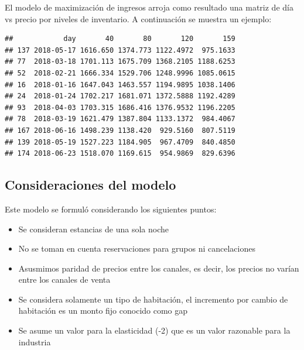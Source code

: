 El modelo de maximización de ingresos arroja como resultado una matriz de día vs precio por niveles de inventario. A continuación se muestra un ejemplo:

\begin{verbatim}
##            day       40       80       120       159
## 137 2018-05-17 1616.650 1374.773 1122.4972  975.1633
## 77  2018-03-18 1701.113 1675.709 1368.2105 1188.6253
## 52  2018-02-21 1666.334 1529.706 1248.9996 1085.0615
## 16  2018-01-16 1647.043 1463.557 1194.9895 1038.1406
## 24  2018-01-24 1702.217 1681.071 1372.5888 1192.4289
## 93  2018-04-03 1703.315 1686.416 1376.9532 1196.2205
## 78  2018-03-19 1621.479 1387.804 1133.1372  984.4067
## 167 2018-06-16 1498.239 1138.420  929.5160  807.5119
## 139 2018-05-19 1527.223 1184.905  967.4709  840.4850
## 174 2018-06-23 1518.070 1169.615  954.9869  829.6396
\end{verbatim}

\subsection*{Consideraciones del modelo}

Este modelo se formuló considerando los siguientes puntos:
\begin{itemize}[noitemsep]
  \item Se consideran estancias de una sola noche
  \item No se toman en cuenta reservaciones para grupos ni cancelaciones
  \item Asusmimos paridad de precios entre los canales, es decir, los precios no varían entre los canales de venta
  \item Se considera solamente un tipo de habitación, el incremento por cambio de habitación es un monto fijo conocido como gap
  \item Se asume un valor para la elasticidad (-2) que es un valor razonable para la industria
\end{itemize}


